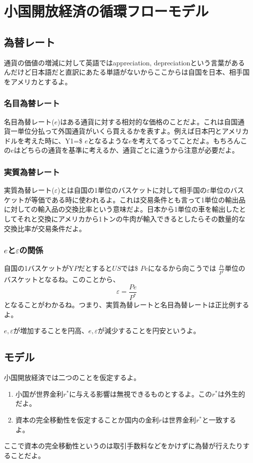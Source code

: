 \documentclass[a4paper, 12pt]{article}
\begin{document}
\newpage

\section{小国開放経済の循環フローモデル}
\subsection{為替レート}
通貨の価値の増減に対して英語ではappreciation, depreciationという言葉があるんだけど日本語だと直訳にあたる単語がないからここからは自国を日本、相手国をアメリカとするよ。
\subsubsection{名目為替レート}
名目為替レート($e$)はある通貨に対する相対的な価格のことだよ。これは自国通貨一単位分払って外国通貨がいくら買えるかを表すよ。例えば日本円とアメリカドルを考えた時に、Y\llap{=}1=\$ $e$となるような$e$を考えてるってことだよ。もちろんこの$e$はどちらの通貨を基準に考えるか、通貨ごとに違うから注意が必要だよ。
\subsubsection{実質為替レート}
実質為替レート($\varepsilon$)とは自国の1単位のバスケットに対して相手国の$\varepsilon$単位のバスケットが等価である時に使われるよ。これは交易条件とも言って1単位の輸出品に対しての輸入品の交換比率という意味だよ。日本から1単位の車を輸出したとしてそれと交換にアメリカから1トンの牛肉が輸入できるとしたらその数量的な交換比率が交易条件だよ。
\subsubsection{$e$と$\varepsilon$の関係}
自国の1バスケットがY\llap{=}$P$だとすると$US$では\$ $Pe$になるから向こうでは $\displaystyle \frac{Pe}{P^*}$単位のバスケットとなるね。このことから、
\begin{equation*}
  \varepsilon = \frac{Pe}{P^*}
\end{equation*}
となることがわかるね。つまり、実質為替レートと名目為替レートは正比例するよ。

$e,\varepsilon$が増加することを円高、$e,\varepsilon$が減少することを円安というよ。
\subsection{モデル}
小国開放経済では二つのことを仮定するよ。
\begin{enumerate}
  \item 小国が世界金利$r^*$に与える影響は無視できるものとするよ。この$r^*$は外生的だよ。
  \item 資本の完全移動性を仮定することか国内の金利$r$は世界金利$r^*$と一致するよ。
\end{enumerate}
ここで資本の完全移動性というのは取引手数料などをかけずに為替が行えたりすることだよ。
\end{document}
